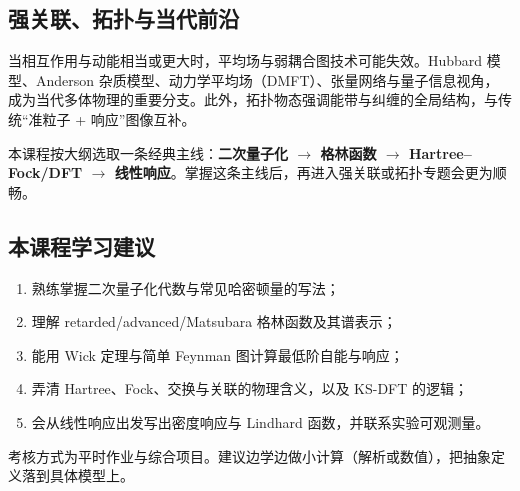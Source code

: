 \subsection{强关联、拓扑与当代前沿}

当相互作用与动能相当或更大时，平均场与弱耦合图技术可能失效。Hubbard 模型、Anderson 杂质模型、动力学平均场（DMFT）、张量网络与量子信息视角，成为当代多体物理的重要分支。此外，拓扑物态强调能带与纠缠的全局结构，与传统“准粒子 + 响应”图像互补。

本课程按大纲选取一条经典主线：\textbf{二次量子化 $\to$ 格林函数 $\to$ Hartree--Fock/DFT $\to$ 线性响应}。掌握这条主线后，再进入强关联或拓扑专题会更为顺畅。

\subsection{本课程学习建议}

\begin{enumerate}
  \item 熟练掌握二次量子化代数与常见哈密顿量的写法；
  \item 理解 retarded/advanced/Matsubara 格林函数及其谱表示；
  \item 能用 Wick 定理与简单 Feynman 图计算最低阶自能与响应；
  \item 弄清 Hartree、Fock、交换与关联的物理含义，以及 KS-DFT 的逻辑；
  \item 会从线性响应出发写出密度响应与 Lindhard 函数，并联系实验可观测量。
\end{enumerate}

考核方式为平时作业与综合项目。建议边学边做小计算（解析或数值），把抽象定义落到具体模型上。
